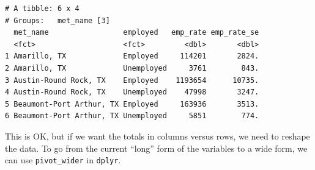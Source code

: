 \documentclass[
  letterpaper,
  DIV=11,
  numbers=noendperiod]{scrreprt}
\newenvironment{Shaded}{\begin{snugshade}}{\end{snugshade}}
\newcommand{\AttributeTok}[1]{\textcolor[rgb]{0.40,0.45,0.13}{#1}}
\newcommand{\DecValTok}[1]{\textcolor[rgb]{0.68,0.00,0.00}{#1}}
\newcommand{\FunctionTok}[1]{\textcolor[rgb]{0.28,0.35,0.67}{#1}}
\newcommand{\NormalTok}[1]{\textcolor[rgb]{0.00,0.23,0.31}{#1}}
\newcommand{\SpecialCharTok}[1]{\textcolor[rgb]{0.37,0.37,0.37}{#1}}
\newcommand{\StringTok}[1]{\textcolor[rgb]{0.13,0.47,0.30}{#1}}
\begin{document}
\begin{Shaded}
\end{Shaded}

\begin{verbatim}
# A tibble: 6 x 4
# Groups:   met_name [3]
  met_name                 employed   emp_rate emp_rate_se
  <fct>                    <fct>         <dbl>       <dbl>
1 Amarillo, TX             Employed     114201       2824.
2 Amarillo, TX             Unemployed     3761        843.
3 Austin-Round Rock, TX    Employed    1193654      10735.
4 Austin-Round Rock, TX    Unemployed    47998       3247.
5 Beaumont-Port Arthur, TX Employed     163936       3513.
6 Beaumont-Port Arthur, TX Unemployed     5851        774.
\end{verbatim}

This is OK, but if we want the totals in columns versus rows, we need to
reshape the data. To go from the current ``long'' form of the variables
to a wide form, we can use \texttt{pivot\_wider} in \texttt{dplyr}.
\end{document}
